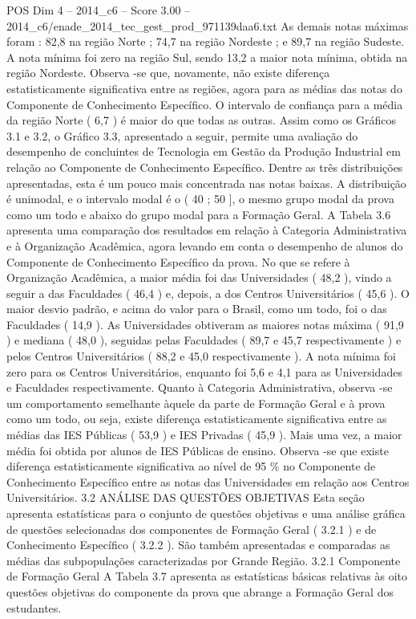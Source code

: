 \begin{textsample}{POS Dim 4 – 2014\_c6 – Score 3.00 – 2014\_c6/enade\_2014\_tec\_gest\_prod\_971139daa6.txt}
As demais notas máximas foram : 82,8 na região Norte ; 74,7 na região Nordeste ; e 89,7 na região Sudeste.
A nota mínima foi zero na região Sul, sendo 13,2 a maior nota mínima, obtida na região Nordeste.
Observa -se que, novamente, não existe diferença estatisticamente significativa entre as regiões, agora para as médias das notas do Componente de Conhecimento Específico.
O intervalo de confiança para a média da região Norte ( 6,7 ) é maior do que todas as outras.
Assim como os Gráficos 3.1 e 3.2, o Gráfico 3.3, apresentado a seguir, permite uma avaliação do desempenho de concluintes de Tecnologia em Gestão da Produção Industrial em relação ao Componente de Conhecimento Específico.
Dentre as três distribuições apresentadas, esta é um pouco mais concentrada nas notas baixas.
A distribuição é unimodal, e o intervalo modal é o ( 40 ; 50 ], o mesmo grupo modal da prova como um todo e abaixo do grupo modal para a Formação Geral.
A Tabela 3.6 apresenta uma comparação dos resultados em relação à Categoria Administrativa e à Organização Acadêmica, agora levando em conta o desempenho de alunos do Componente de Conhecimento Específico da prova.
No que se refere à Organização Acadêmica, a maior média foi das Universidades ( 48,2 ), vindo a seguir a das Faculdades ( 46,4 ) e, depois, a dos Centros Universitários ( 45,6 ).
O maior desvio padrão, e acima do valor para o Brasil, como um todo, foi o das Faculdades ( 14,9 ).
As Universidades obtiveram as maiores notas máxima ( 91,9 ) e mediana ( 48,0 ), seguidas pelas Faculdades ( 89,7 e 45,7 respectivamente ) e pelos Centros Universitários ( 88,2 e 45,0 respectivamente ).
A nota mínima foi zero para os Centros Universitários, enquanto foi 5,6 e 4,1 para as Universidades e Faculdades respectivamente.
Quanto à Categoria Administrativa, observa -se um comportamento semelhante àquele da parte de Formação Geral e à prova como um todo, ou seja, existe diferença estatisticamente significativa entre as médias das IES Públicas ( 53,9 ) e IES Privadas ( 45,9 ).
Mais uma vez, a maior média foi obtida por alunos de IES Públicas de ensino.
Observa -se que existe diferença estatisticamente significativa ao nível de 95 \% no Componente de Conhecimento Específico entre as notas das Universidades em relação aos Centros Universitários. 3.2 ANÁLISE DAS QUESTÕES OBJETIVAS Esta seção apresenta estatísticas para o conjunto de questões objetivas e uma análise gráfica de questões selecionadas dos componentes de Formação Geral ( 3.2.1 ) e de Conhecimento Específico ( 3.2.2 ).
São também apresentadas e comparadas as médias das subpopulações caracterizadas por Grande Região. 3.2.1 Componente de Formação Geral A Tabela 3.7 apresenta as estatísticas básicas relativas às oito questões objetivas do componente da prova que abrange a Formação Geral dos estudantes.

\end{textsample}
